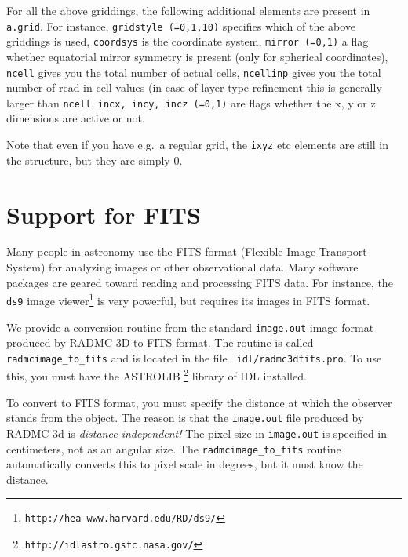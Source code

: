 \documentclass{report}
\begin{document}
For all the above griddings, the following additional elements are present
in {\small\tt a.grid}. For instance, {\small\tt gridstyle (=0,1,10)}
specifies which of the above griddings is used, {\small\tt coordsys} is the
coordinate system, {\small\tt mirror (=0,1)} a flag whether equatorial
mirror symmetry is present (only for spherical coordinates), {\small\tt
  ncell} gives you the total number of actual cells, {\small\tt ncellinp}
gives you the total number of read-in cell values (in case of layer-type
refinement this is generally larger than {\small\tt ncell}, {\small\tt incx,
  incy, incz (=0,1)} are flags whether the x, y or z dimensions are active
or not.

Note that even if you have e.g.\ a regular grid, the {\small\tt ixyz} etc
elements are still in the structure, but they are simply 0.



\section{Support for FITS}
\label{sec-fits-support}
%
Many people in astronomy use the FITS format (Flexible Image Transport
System) for analyzing images or other observational data. Many software
packages are geared toward reading and processing FITS data. For instance,
the {\small\tt ds9} image viewer\footnote{{\footnotesize\tt http://hea-www.harvard.edu/RD/ds9/}}
is very powerful, but requires its images in FITS format.

We provide a conversion routine from the standard {\small\tt image.out}
image format produced by RADMC-3D to FITS format. The routine is called
{\small\tt radmcimage\_to\_fits} and is located in the file {\small\tt
  idl/radmc3dfits.pro}. To use this, you must have the ASTROLIB
\footnote{{\footnotesize\tt http://idlastro.gsfc.nasa.gov/}} library of IDL
installed.

To convert to FITS format, you must specify the distance at which the
observer stands from the object. The reason is that the {\small\tt image.out}
file produced by RADMC-3d is {\em distance independent!} The pixel size
in {\small\tt image.out} is specified in centimeters, not as an angular
size. The {\small\tt radmcimage\_to\_fits} routine automatically converts 
this to pixel scale in degrees, but it must know the distance. 
\end{document}
